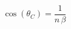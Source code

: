 \documentclass[preview,border=2pt]{standalone}
\begin{document}
\color[HTML]{CAEFF3}
\[\displaystyle \cos\!\left(\theta_C\right)=\frac{1}{n\,\beta}\]
\end{document}
